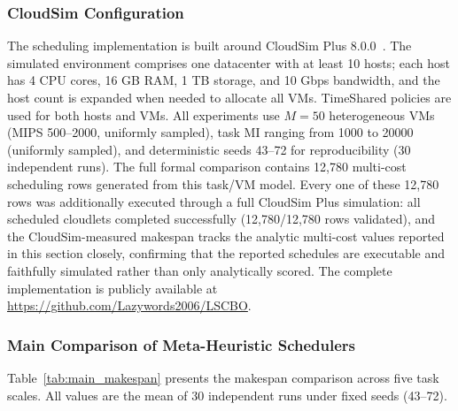\documentclass[pdflatex,onecolumn,sn-mathphys-num]{sn-jnl}
\begin{document}
\subsubsection{CloudSim Configuration}
The scheduling implementation is built around CloudSim Plus 8.0.0~\cite{Calheiros2011,SilvaFilho2017}. The simulated environment comprises one datacenter with at least 10 hosts; each host has 4 CPU cores, 16 GB RAM, 1 TB storage, and 10 Gbps bandwidth, and the host count is expanded when needed to allocate all VMs. TimeShared policies are used for both hosts and VMs. All experiments use $M=50$ heterogeneous VMs (MIPS 500--2000, uniformly sampled), task MI ranging from 1000 to 20000 (uniformly sampled), and deterministic seeds 43--72 for reproducibility (30 independent runs). The full formal comparison contains 12,780 multi-cost scheduling rows generated from this task/VM model. Every one of these 12,780 rows was additionally executed through a full CloudSim Plus simulation: all scheduled cloudlets completed successfully (12,780/12,780 rows validated), and the CloudSim-measured makespan tracks the analytic multi-cost values reported in this section closely, confirming that the reported schedules are executable and faithfully simulated rather than only analytically scored. The complete implementation is publicly available at \url{https://github.com/Lazywords2006/LSCBO}.

\subsubsection{Main Comparison of Meta-Heuristic Schedulers}
Table~\ref{tab:main_makespan} presents the makespan comparison across five task scales. All values are the mean of 30 independent runs under fixed seeds (43--72).

\begin{table}[ht]
\centering
\caption{Cross-Scale Makespan Comparison (mean, 30 runs per scale)}\label{tab:main_makespan}
\end{table}
\end{document}
